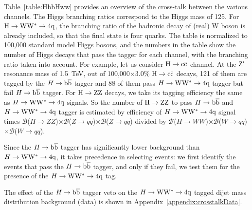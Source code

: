 
Table~\ref{table:HbbHww} provides an overview of the cross-talk
between the various channels.  The Higgs branching ratios correspond
to the Higgs mass of 125\GeVcc. 
 For ${\rm H \to WW^* \to 4q }$,
the branching ratio of the hadronic decay of (real) W boson is already 
included, so that the final state is four quarks.
%
The table is normalized to 100,000 standard model Higgs
bosons, and the numbers in the
table show the number of Higgs decays that pass the tagger for each
channel, with the branching ratio taken into account.  
For example, 
let us consider ${\rm H \to c\bar{c}}$ channel.  At the ${\rm Z'}$ resonance
mass of 1.5~TeV, out of 100,000$\times$3.0\% ${\rm H \to c\bar{c}}$ decays,  121 of them
are tagged by the $H\to\mathrm{b\overline{b}}$ tagger  
and  88 of them pass $H\to{\rm W}{\rm W}^*\to4{\rm q}$ tagger but fail $H\to\mathrm{b\overline{b}}$ tagger.
For ${\rm H \to ZZ}$ decays, we take its tagging efficiency the same 
as $H\to{\rm W}{\rm W}^*\to4{\rm q}$ signals. So the number of ${\rm H \to ZZ}$ to pass $H\to\mathrm{b\overline{b}}$ and 
$H\to{\rm W}{\rm W}^*\to4{\rm q}$ tagger is estimated by 
efficiency of $H\to{\rm W}{\rm W}^*\to4{\rm q}$ signal times 
 $\mathcal{B}$($H \to ZZ$)$\times \mathcal{B}$($Z \to qq$)$\times\mathcal{B}$($Z\to qq$) divided by 
 $\mathcal{B}$($H \to WW$)$\times\mathcal{B}$($W \to qq$)$\times\mathcal{B}$($W\to qq$). 




Since the $H\to\mathrm{b\overline{b}}$ tagger has significantly lower background than $H\to{\rm W}{\rm W}^*\to4{\rm q}$,
it takes precedence in selecting events: we first identify the
events that pass the $H\to\mathrm{b\overline{b}}$ tagger, and only if they fail,  we
test them for the presence of the $H\to{\rm W}{\rm W}^*\to4{\rm q}$ tag.  



The effect of the $H\to\mathrm{b\overline{b}}$ tagger veto on the $H\to{\rm W}{\rm W}^*\to4{\rm q}$ tagged dijet 
mass distribution
background (data) is shown in Appendix~\ref{appendix:crosstalkData}.


